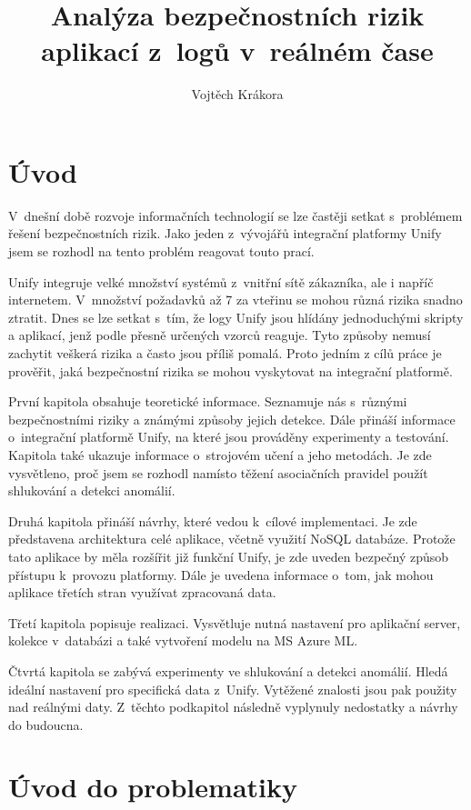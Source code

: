 \documentclass[thesis=M,czech]{FITthesis}[2012/10/20]
\title{Analýza bezpečnostních rizik aplikací z~logů v~reálném čase}
\author{Vojtěch Krákora} %
\begin{document}

\chapter{Úvod}
V~dnešní době rozvoje informačních technologií se lze častěji setkat s~problémem řešení bezpečnostních rizik. Jako jeden z~vývojářů integrační platformy Unify jsem se rozhodl na tento problém reagovat touto prací. 

Unify integruje velké množství systémů z~vnitřní sítě zákazníka, ale i napříč internetem. V~množství požadavků až 7 za vteřinu se mohou různá rizika snadno ztratit. Dnes se lze setkat s~tím, že logy Unify jsou hlídány jednoduchými skripty a aplikací, jenž podle přesně určených vzorců reaguje. Tyto způsoby nemusí zachytit veškerá rizika a často jsou příliš pomalá. Proto jedním z cílů práce je prověřit, jaká bezpečnostní rizika se mohou vyskytovat na integrační platformě.

První kapitola obsahuje teoretické informace. Seznamuje nás s~různými bezpečnostními riziky a známými způsoby jejich detekce. Dále přináší informace o~integrační platformě Unify, na které jsou prováděny experimenty a testování. Kapitola také ukazuje informace o~strojovém učení a jeho metodách. Je zde vysvětleno, proč jsem se rozhodl namísto těžení asociačních pravidel použít shlukování a detekci anomálií.

Druhá kapitola přináší návrhy, které vedou k~cílové implementaci. Je zde představena architektura celé aplikace, včetně využití NoSQL databáze. Protože tato aplikace by měla rozšířit již funkční Unify, je zde uveden bezpečný způsob přístupu k~provozu platformy. Dále je uvedena informace o~tom, jak mohou aplikace třetích stran využívat zpracovaná data.

Třetí kapitola popisuje realizaci. Vysvětluje nutná nastavení pro aplikační server, kolekce v~databázi a také vytvoření modelu na MS Azure ML.

Čtvrtá kapitola se zabývá experimenty ve shlukování a detekci anomálií. Hledá ideální nastavení pro specifická data z~Unify. Vytěžené znalosti jsou pak použity nad reálnými daty. Z~těchto podkapitol následně vyplynuly nedostatky a návrhy do budoucna.
  


\chapter{Úvod do problematiky}
	
\end{document}
